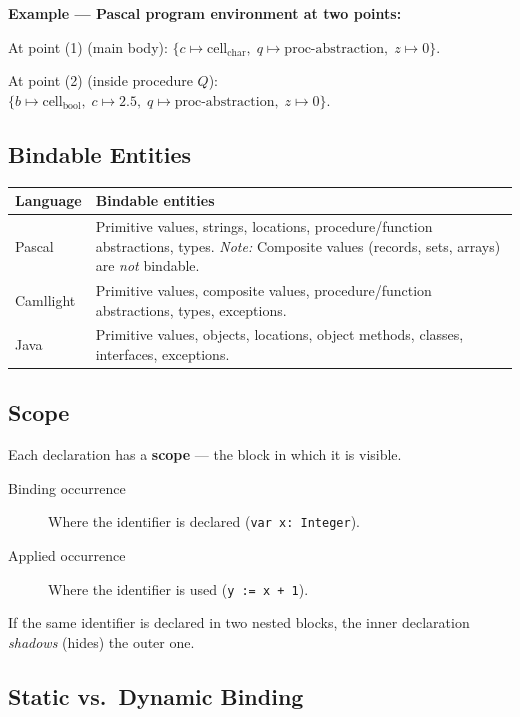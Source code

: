 \documentclass[12pt,a4paper]{article}
\begin{document}
\textbf{Example --- Pascal program environment at two points:}

At point (1) (main body): $\{c \mapsto \text{cell}_{\text{char}},\; q \mapsto \text{proc-abstraction},\; z \mapsto 0\}$.

At point (2) (inside procedure $Q$): $\{b \mapsto \text{cell}_{\text{bool}},\; c \mapsto 2.5,\; q \mapsto \text{proc-abstraction},\; z \mapsto 0\}$.

\subsection{Bindable Entities}

\begin{center}
\begin{tabular}{lp{7cm}}
\toprule
Language & Bindable entities\\
\midrule
Pascal      & Primitive values, strings, locations, procedure/function abstractions, types.
              \newline\textit{Note:} Composite values (records, sets, arrays) are \emph{not} bindable.\\
Camllight   & Primitive values, composite values, procedure/function abstractions, types, exceptions.\\
Java        & Primitive values, objects, locations, object methods, classes, interfaces, exceptions.\\
\bottomrule
\end{tabular}
\end{center}

\subsection{Scope}

Each declaration has a \textbf{scope} — the block in which it is visible.

\begin{description}
  \item[Binding occurrence] Where the identifier is declared (\texttt{var x: Integer}).
  \item[Applied occurrence] Where the identifier is used (\texttt{y := x + 1}).
\end{description}

If the same identifier is declared in two nested blocks, the inner declaration
\emph{shadows} (hides) the outer one.

\subsection{Static vs.\ Dynamic Binding}
\end{document}
